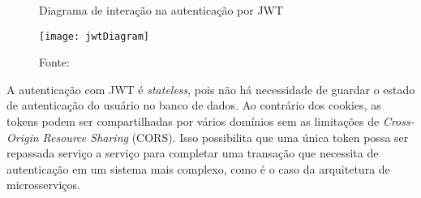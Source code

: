 \begin{figure}
	\centering
	\caption{Diagrama de interação na autenticação por JWT}
  \texttt{[image: jwtDiagram]}
  \caption*{Fonte: \cite{jwt}}
\label{fig:jwtDiagram}
\end{figure}

A autenticação com JWT é \textit{stateless}, pois não há necessidade de guardar o estado de autenticação do usuário no banco de dados. Ao contrário dos cookies, as tokens podem ser compartilhadas por vários domínios sem as limitações de \textit{Cross-Origin Resource Sharing} (CORS). Isso possibilita que uma única token possa ser repassada serviço a serviço para completar uma transação que necessita de autenticação em um sistema mais complexo, como é o caso da arquitetura de microsserviços.
